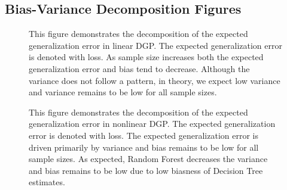 \subsection{Bias-Variance Decomposition Figures}
\begin{figure}[H]
	\centering
	\captionsetup{format=plain}
	\caption{This figure demonstrates the decomposition of the expected generalization error in linear DGP. 
			The expected generalization error is denoted with loss. 
			As sample size increases both the expected generalization error and bias tend to decrease. 
			Although the variance does not follow a pattern, in theory, we expect low variance and 
			variance remains to be low for all sample sizes.}
	\label{fig:bias_var_linear}
\end{figure}

\begin{figure}[H]
	\centering
	\captionsetup{format=plain}
	\caption{This figure demonstrates the decomposition of the expected generalization error in nonlinear DGP. 
			The expected generalization error is denoted with loss. 
			The expected generalization error is driven primarily 
			by variance and bias remains to be low for all sample sizes. 
			As expected, Random Forest decreases the variance and bias remains to be low due to low biasness of Decision Tree estimates.}
	\label{fig:bias_var_nonlinear}
\end{figure}



